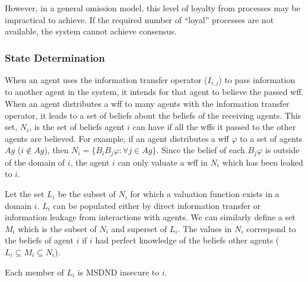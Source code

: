 However, in a general omission model, this level of loyalty from processes may be impractical to achieve.
If the required number of ``loyal'' processes are not available, the system cannot achieve consensus.

\subsubsection{State Determination}

When an agent uses the information transfer operator ($I_{i,j}$) to pass information to another agent in the system, it intends for that agent to believe the passed wff.
When an agent distributes a wff to many agents with the information transfer operator, it leads to a set of beliefs about the beliefs of the receiving agents.
This set, $N_i$, is the set of beliefs agent $i$ can have if all the wffs it passed to the other agents are believed.
For example, if an agent distributes a wff $\varphi$ to a set of agents $Ag$ ($i \not \in Ag$), then $N_i = \{ B_i B_j \varphi : \forall j \in Ag \}$.
Since the belief of each $B_j \varphi$ is outside of the domain of $i$, the agent $i$ can only valuate a wff in $N_i$ which has been leaked to $i$.

Let the set $L_i$ be the subset of $N_i$ for which a valuation function exists in a domain $i$.
$L_i$ can be populated either by direct information transfer or information leakage from interactions with agents.
We can similarly define a set $M_i$ which is the subset of $N_i$ and superset of $L_i$.
The values in $N_i$ correspond to the beliefs of agent $i$ if $i$ had perfect knowledge of the beliefs other agents ($L_i \subseteq M_i \subseteq N_i$).

\begin{thm}
Each member of $L_i$ is MSDND insecure to $i$.
\end{thm}

